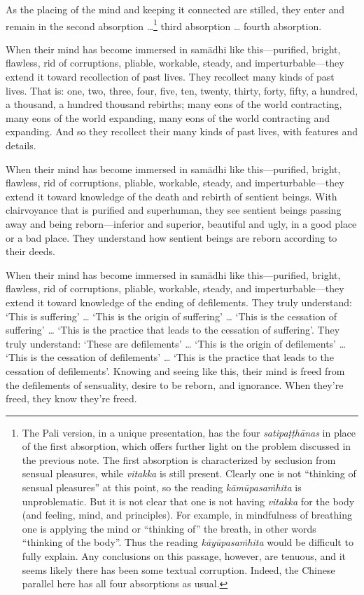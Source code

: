 \documentclass[12pt,openany]{book}%
\begin{document}
As the placing of the mind and keeping it connected are stilled, they enter and remain in the second absorption …\footnote{The Pali version, in a unique presentation, has the four \textit{\textsanskrit{satipaṭṭhānas}} in place of the first absorption, which offers further light on the problem discussed in the previous note. The first absorption is characterized by seclusion from sensual pleasures, while \textit{vitakka} is still present. Clearly one is not “thinking of sensual pleasures” at this point, so the reading \textit{\textsanskrit{kāmūpasaṁhita}} is unproblematic. But it is not clear that one is not having \textit{vitakka} for the body (and feeling, mind, and principles). For example, in mindfulness of breathing one is applying the mind or “thinking of” the breath, in other words “thinking of the body”. Thus the reading \textit{\textsanskrit{kāyūpasaṁhita}} would be difficult to fully explain. Any conclusions on this passage, however, are tenuous, and it seems likely there has been some textual corruption. Indeed, the Chinese parallel here has all four absorptions as usual. } third absorption … fourth absorption. 

When their mind has become immersed in \textsanskrit{samādhi} like this—purified, bright, flawless, rid of corruptions, pliable, workable, steady, and imperturbable—they extend it toward recollection of past lives. They recollect many kinds of past lives. That is: one, two, three, four, five, ten, twenty, thirty, forty, fifty, a hundred, a thousand, a hundred thousand rebirths; many eons of the world contracting, many eons of the world expanding, many eons of the world contracting and expanding. And so they recollect their many kinds of past lives, with features and details. 

When their mind has become immersed in \textsanskrit{samādhi} like this—purified, bright, flawless, rid of corruptions, pliable, workable, steady, and imperturbable—they extend it toward knowledge of the death and rebirth of sentient beings. With clairvoyance that is purified and superhuman, they see sentient beings passing away and being reborn—inferior and superior, beautiful and ugly, in a good place or a bad place. They understand how sentient beings are reborn according to their deeds. 

When their mind has become immersed in \textsanskrit{samādhi} like this—purified, bright, flawless, rid of corruptions, pliable, workable, steady, and imperturbable—they extend it toward knowledge of the ending of defilements. They truly understand: ‘This is suffering’ … ‘This is the origin of suffering’ … ‘This is the cessation of suffering’ … ‘This is the practice that leads to the cessation of suffering’. They truly understand: ‘These are defilements’ … ‘This is the origin of defilements’ … ‘This is the cessation of defilements’ … ‘This is the practice that leads to the cessation of defilements’. Knowing and seeing like this, their mind is freed from the defilements of sensuality, desire to be reborn, and ignorance. When they’re freed, they know they’re freed. 
\end{document}
